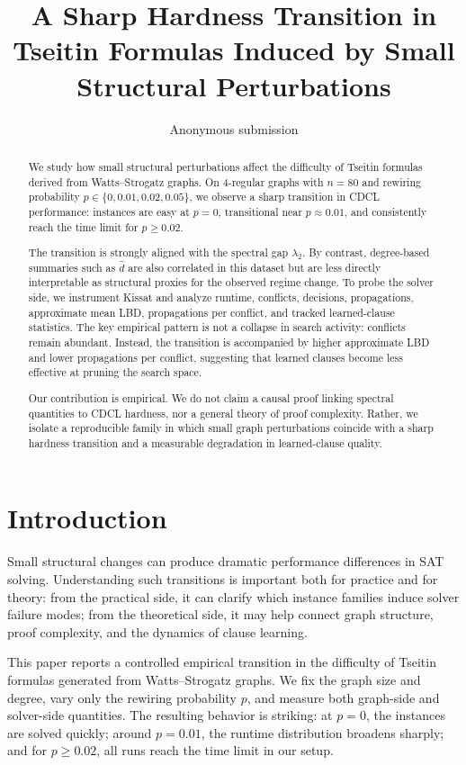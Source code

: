\documentclass[11pt]{article}
\title{A Sharp Hardness Transition in Tseitin Formulas Induced by Small Structural Perturbations}
\author{Anonymous submission}
\date{}
\begin{document}
\maketitle

\begin{abstract}
We study how small structural perturbations affect the difficulty of Tseitin formulas derived from Watts--Strogatz graphs. On 4-regular graphs with $n=80$ and rewiring probability $p \in \{0, 0.01, 0.02, 0.05\}$, we observe a sharp transition in CDCL performance: instances are easy at $p=0$, transitional near $p \approx 0.01$, and consistently reach the time limit for $p \geq 0.02$.

The transition is strongly aligned with the spectral gap $\lambda_2$. By contrast, degree-based summaries such as $\hat d$ are also correlated in this dataset but are less directly interpretable as structural proxies for the observed regime change. To probe the solver side, we instrument Kissat and analyze runtime, conflicts, decisions, propagations, approximate mean LBD, propagations per conflict, and tracked learned-clause statistics. The key empirical pattern is not a collapse in search activity: conflicts remain abundant. Instead, the transition is accompanied by higher approximate LBD and lower propagations per conflict, suggesting that learned clauses become less effective at pruning the search space.

Our contribution is empirical. We do not claim a causal proof linking spectral quantities to CDCL hardness, nor a general theory of proof complexity. Rather, we isolate a reproducible family in which small graph perturbations coincide with a sharp hardness transition and a measurable degradation in learned-clause quality.
\end{abstract}

\section{Introduction}

Small structural changes can produce dramatic performance differences in SAT solving. Understanding such transitions is important both for practice and for theory: from the practical side, it can clarify which instance families induce solver failure modes; from the theoretical side, it may help connect graph structure, proof complexity, and the dynamics of clause learning.

This paper reports a controlled empirical transition in the difficulty of Tseitin formulas generated from Watts--Strogatz graphs. We fix the graph size and degree, vary only the rewiring probability $p$, and measure both graph-side and solver-side quantities. The resulting behavior is striking: at $p=0$, the instances are solved quickly; around $p=0.01$, the runtime distribution broadens sharply; and for $p \geq 0.02$, all runs reach the time limit in our setup.
\end{document}
